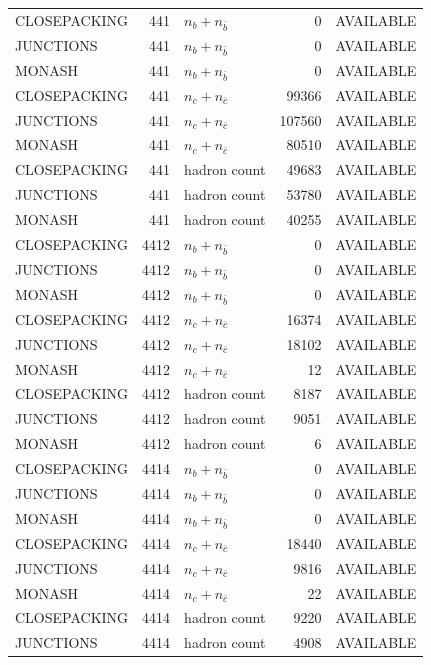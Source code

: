 \begin{landscape}
\begin{longtable}{@{}lrlrl@{}}
CLOSEPACKING & 441 & $n_b+n_{\bar b}$ & \num{0} & AVAILABLE \\
JUNCTIONS & 441 & $n_b+n_{\bar b}$ & \num{0} & AVAILABLE \\
MONASH & 441 & $n_b+n_{\bar b}$ & \num{0} & AVAILABLE \\
CLOSEPACKING & 441 & $n_c+n_{\bar c}$ & \num{99366} & AVAILABLE \\
JUNCTIONS & 441 & $n_c+n_{\bar c}$ & \num{107560} & AVAILABLE \\
MONASH & 441 & $n_c+n_{\bar c}$ & \num{80510} & AVAILABLE \\
CLOSEPACKING & 441 & hadron count & \num{49683} & AVAILABLE \\
JUNCTIONS & 441 & hadron count & \num{53780} & AVAILABLE \\
MONASH & 441 & hadron count & \num{40255} & AVAILABLE \\
CLOSEPACKING & 4412 & $n_b+n_{\bar b}$ & \num{0} & AVAILABLE \\
JUNCTIONS & 4412 & $n_b+n_{\bar b}$ & \num{0} & AVAILABLE \\
MONASH & 4412 & $n_b+n_{\bar b}$ & \num{0} & AVAILABLE \\
CLOSEPACKING & 4412 & $n_c+n_{\bar c}$ & \num{16374} & AVAILABLE \\
JUNCTIONS & 4412 & $n_c+n_{\bar c}$ & \num{18102} & AVAILABLE \\
MONASH & 4412 & $n_c+n_{\bar c}$ & \num{12} & AVAILABLE \\
CLOSEPACKING & 4412 & hadron count & \num{8187} & AVAILABLE \\
JUNCTIONS & 4412 & hadron count & \num{9051} & AVAILABLE \\
MONASH & 4412 & hadron count & \num{6} & AVAILABLE \\
CLOSEPACKING & 4414 & $n_b+n_{\bar b}$ & \num{0} & AVAILABLE \\
JUNCTIONS & 4414 & $n_b+n_{\bar b}$ & \num{0} & AVAILABLE \\
MONASH & 4414 & $n_b+n_{\bar b}$ & \num{0} & AVAILABLE \\
CLOSEPACKING & 4414 & $n_c+n_{\bar c}$ & \num{18440} & AVAILABLE \\
JUNCTIONS & 4414 & $n_c+n_{\bar c}$ & \num{9816} & AVAILABLE \\
MONASH & 4414 & $n_c+n_{\bar c}$ & \num{22} & AVAILABLE \\
CLOSEPACKING & 4414 & hadron count & \num{9220} & AVAILABLE \\
JUNCTIONS & 4414 & hadron count & \num{4908} & AVAILABLE \\

\end{longtable}
\end{landscape}
